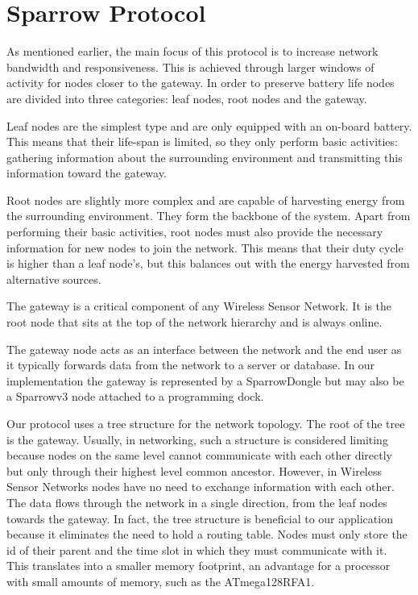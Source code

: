 
\chapter{Sparrow Protocol}

As mentioned earlier, the main focus of this protocol is to increase network
bandwidth and responsiveness. This is achieved through larger windows of
activity for nodes closer to the gateway. In order to preserve battery life
nodes are divided into three categories: leaf nodes, root nodes and the
gateway. 

Leaf nodes are the simplest type and are only equipped with an on-board
battery. This means that their life-span is limited, so they only perform basic
activities: gathering information about the surrounding environment and
transmitting this information toward the gateway. 

Root nodes are slightly more complex and are capable of harvesting energy from
the surrounding environment. They form the backbone of the system. Apart from
performing their basic activities, root nodes must also provide the necessary
information for new nodes to join the network. This means that their duty cycle
is higher than a leaf node's, but this balances out with the energy harvested
from alternative sources.

The gateway is a critical component of any Wireless Sensor Network. It is the
root node that sits at the top of the network hierarchy and is always online.

The gateway node acts as an interface between the network and the end user as
it typically forwards data from the network to a server or database. In our
implementation the gateway is represented by a SparrowDongle but may also be a
Sparrowv3 node attached to a programming dock.

Our protocol uses a tree structure for the network topology. The root of the
tree is the gateway. Usually, in networking, such a structure is considered
limiting because nodes on the same level cannot communicate with each other
directly but only through their highest level common ancestor. However, in
Wireless Sensor Networks nodes have no need to exchange information with each
other. The data flows through the network in a single direction, from the leaf
nodes towards the gateway. In fact, the tree structure is beneficial to our
application because it eliminates the need to hold a routing table. Nodes must
only store the id of their parent and the time slot in which they must
communicate with it. This translates into a smaller memory footprint, an
advantage for a processor with small amounts of memory, such as the
\mbox{ATmega128RFA1}.

